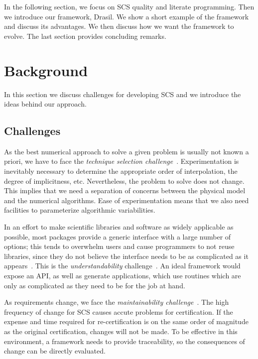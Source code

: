 \documentclass{sig-alternate-05-2015}
\newcommand{\lss}{Drasil}
\begin{document}
In the following section, we  
focus on SCS quality and literate programming.
Then we introduce our framework, \lss{}.  We show
a short example of the framework and discuss its advantages. 
We then discuss how we want the framework to evolve. %
The last section provides concluding remarks.

\section{Background} \label{sec:background}

In this section we discuss challenges for developing SCS and we
introduce the ideas behind our approach.

\subsection{Challenges} \label{ssec:challenges}

As the best numerical approach to solve a given problem is usually not known a
priori, we have to face the \textit{technique selection
  challenge}~\cite{Yu2011}. Experimentation is inevitably necessary to determine
the appropriate order of interpolation, the degree of implicitness,
etc. Nevertheless, the problem to solve does not change.  This implies that we
need a separation of concerns between the physical model and the numerical
algorithms.  Ease of experimentation means that we also need facilities to
parameterize algorithmic variabilities.

In an effort to make scientific libraries and software as widely applicable as
possible, most packages provide a generic interface with a large number of
options; this tends to overwhelm users and cause programmers to not reuse
libraries, since they do not believe the interface needs to be as complicated
as it appears~\cite{Dubois2002}. This is the \textit{understandability}
challenge~\cite{Yu2011}.  An ideal framework would expose an
API, as well as generate applications, which use routines which are only as
complicated as they need to be for the job at hand.

As requirements change, we face the \textit{maintainability
challenge}~\cite{Yu2011}.  The high frequency of change for SCS
causes accute problems for certification. If the expense and time required for
re-certification is on the same order of magnitude as the original
certification, changes will not be made. To be effective in this environment, a
framework needs to provide traceability, so the consequences of change can be
directly evaluated.
\end{document}
